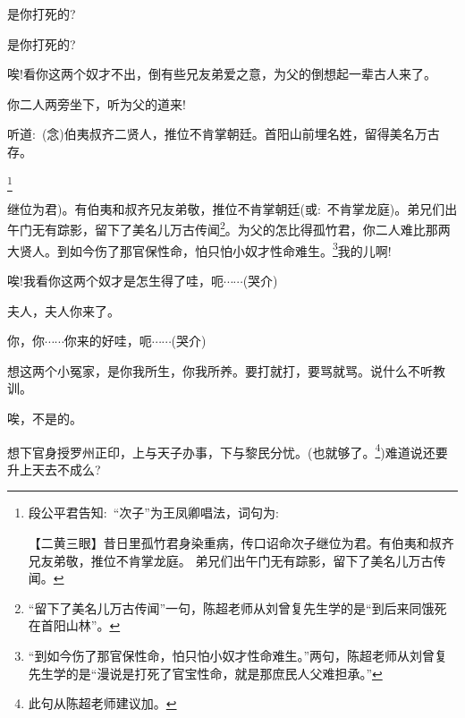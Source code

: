 {


{是你打死的?}

{是你打死的?}

{唉!看你这两个奴才不出，倒有些兄友弟爱之意，为父的倒想起一辈古人来了。}

{你二人两旁坐下，听为父的道来!}

{听道:~({\akai 念})伯夷叔齐二贤人，推位不肯掌朝廷。首阳山前埋名姓，留得美名万古存。}

\footnote{段公平君告知:~``次子''为王凤卿唱法，词句为:~ 

【{\akai 二黄三眼}】昔日里孤竹君身染重病，传口诏命次子继位为君。有伯夷和叔齐兄友弟敬，推位不肯掌龙庭。  弟兄们出午门无有踪影，留下了美名儿万古传闻。}}{继位为君)。有伯夷和叔齐兄友弟敬，推位不肯掌朝廷(或:~不肯掌龙庭)。弟兄们出午门无有踪影，留下了美名儿万古传闻}\footnote{``{留下了美名儿万古传闻}''一句，陈超老师从刘曾复先生学的是``{到后来同饿死在首阳山林}''。}{。为父的怎比得孤竹君，你二人难比那两大贤人。到如今伤了那官保性命，怕只怕小奴才性命难生。}\footnote{{``到如今伤了那官保性命，怕只怕小奴才性命难生。''两句，}陈超老师从刘曾复先生学的是``{漫说是打死了官宝性命}，{就是那庶民人父难担承}。''}{我的儿啊!}




{唉!我看你这两个奴才是怎生得了哇，呃$\cdots{}\cdots{}$({\hwfs 哭}{\hwfs 介})}

{夫人，夫人你来了。}

{你，你$\cdots{}\cdots{}$你来的好哇，呃$\cdots{}\cdots{}$({\hwfs 哭}{\hwfs 介})}

{想这两个小冤家，是你我所生，你我所养。要打就打，要骂就骂。说什么不听教训。}

{唉，不是的。}

{想下官身授罗州正印，上与天子办事，下与黎民分忧。(}也就够了。\footnote{此句从陈超老师建议加。}{)难道说还要升上天去不成么?}

